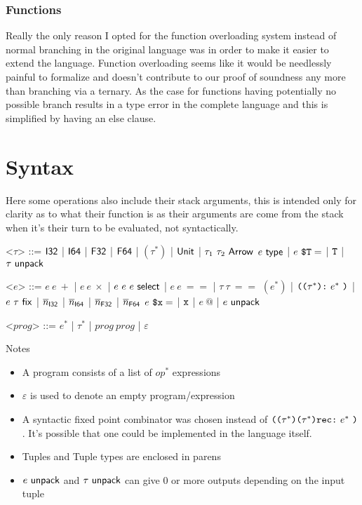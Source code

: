 \documentclass{article}
\begin{document}
\subsubsection{Functions}
Really the only reason I opted for the function overloading system instead of normal branching in the original language was in order to make it easier to extend the language.
Function overloading seems like it would be needlessly painful to formalize and doesn't contribute to our proof of soundness any more than branching via a ternary. As the case for functions having potentially no possible branch results in a type error in the complete language and this is simplified by having an else clause.

\section{Syntax}
Here some operations also include their stack arguments, this is intended only for clarity as to what their function is as their arguments are come from the stack when it's their turn to be evaluated, not syntactically.

\renewcommand{\grammarlabel}[2]{#1 \hfill#2}
\begin{grammar}
    <$\tau$> ::= $\mathsf{I32}$
    |    $\mathsf{I64}$
    |    $\mathsf{F32}$
    |    $\mathsf{F64}$
    |    $(\tau^*)$
    |    $\mathsf{Unit}$
    |    $\tau_1 ~ \tau_2 ~ \mathsf{Arrow}$
    \alt $e ~ \mathsf{type}$
    |    $e~ \texttt{\$T} =$
    |    $\texttt{T}$
    |    $\tau ~ \mathsf{unpack}$

    <$e$> ::= $e~ e~ +$
    |    $e~ e~ \times$
    |    $e ~ e ~ e ~ \mathsf{select} $
    |    $e~ e~ ==$
    |    $\tau~ \tau~ ==$
    \alt $(e^*)$
    |    $\texttt{((} \tau^* \texttt{):} ~ e^* ~ \texttt{)}$
    |    $e ~ \tau ~ \mathsf{fix}$
    |    $\overline{n}_{\mathsf{I32}}$
    |    $\overline{n}_{\mathsf{I64}}$
    |    $\overline{n}_{\mathsf{F32}}$
    |    $\overline{n}_{\mathsf{F64}}$
    \alt $e~ \texttt{\$x} =$
    |    $\texttt{x}$
    |    $e~ \textbf{@} $
    |    $e ~ \mathsf{unpack}$
    
    <$prog$> ::= $e^*$ | $\tau^*$ | $prog~ prog$ | $\varepsilon$
\end{grammar}
Notes
\begin{itemize}
    \item A program consists of a list of $op^*$ expressions
    \item $\varepsilon$ is used to denote an empty program/expression
    \item A syntactic fixed point combinator was chosen instead of $\texttt{((} \tau^* \texttt{)(} \tau^* \texttt{)rec:} ~ e^* ~ \texttt{)}$. It's possible that one could be implemented in the language itself.
    \item Tuples and Tuple types are enclosed in parens
    \item $e ~ \mathsf{unpack}$ and $\tau ~ \mathsf{unpack}$ can give 0 or more outputs depending on the input tuple
\end{itemize}
\end{document}
